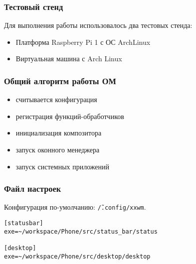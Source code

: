 
\begin{frame}
\frametitle{Тестовый стенд}

Для выполнения работы использовалось два тестовых стенда:
\begin{itemize}
\item Платформа Raspberry Pi 1 с ОС ArchLinux
\item Виртуальная машина с Arch Linux
\end{itemize}

\end{frame}


\begin{frame}
\frametitle{Общий алгоритм работы ОМ}

\begin{itemize}
\item считывается конфигурация
\item регистрация функций-обработчиков
\item инициализация композитора
\item запуск оконного менеджера
\item запуск системных приложений
\end{itemize}

\end{frame}


\begin{frame}[fragile]
\frametitle{Файл настроек}

Конфигурация по-умолчанию: \texttt{\~/.config/xxwm}.

\begin{lstlisting}[style=crs_cpp]
[statusbar]
exe=~/workspace/Phone/src/status_bar/status

[desktop]
exe=~/workspace/Phone/src/desktop/desktop
\end{lstlisting}

\end{frame}


